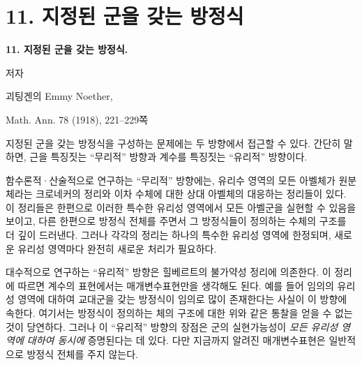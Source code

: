 
\section*{11. 지정된 군을 갖는 방정식}
\begin{center}
{\Large\bfseries 11. 지정된 군을 갖는 방정식.}\par
\vspace{0.75em}
저자\par
\vspace{0.75em}
괴팅겐의 Emmy Noether,\par
\vspace{1.5em}
Math. Ann. 78 (1918), 221--229쪽
\end{center}

\vspace{4em}

지정된 군을 갖는 방정식을 구성하는 문제에는 두 방향에서 접근할 수 있다. 간단히 말하면, 근을 특징짓는 ``무리적'' 방향과 계수를 특징짓는 ``유리적'' 방향이다.

함수론적·산술적으로 연구하는 ``무리적'' 방향에는, 유리수 영역의 모든 아벨체가 원분체라는 크로네커의 정리와 이차 수체에 대한 상대 아벨체의 대응하는 정리들이 있다. 이 정리들은 한편으로 이러한 특수한 유리성 영역에서 모든 아벨군을 실현할 수 있음을 보이고, 다른 한편으로 방정식 전체를 주면서 그 방정식들이 정의하는 수체의 구조를 더 깊이 드러낸다. 그러나 각각의 정리는 하나의 특수한 유리성 영역에 한정되며, 새로운 유리성 영역마다 완전히 새로운 처리가 필요하다.

대수적으로 연구하는 ``유리적'' 방향은 힐베르트의 불가약성 정리에 의존한다. 이 정리에 따르면 계수의 표현에서는 매개변수표현만을 생각해도 된다. 예를 들어 임의의 유리성 영역에 대하여 교대군을 갖는 방정식이 임의로 많이 존재한다는 사실이 이 방향에 속한다. 여기서는 방정식이 정의하는 체의 구조에 대한 위와 같은 통찰을 얻을 수 없는 것이 당연하다. 그러나 이 ``유리적'' 방향의 장점은 군의 실현가능성이 \emph{모든 유리성 영역에 대하여 동시에} 증명된다는 데 있다. 다만 지금까지 알려진 매개변수표현은 일반적으로 방정식 전체를 주지 않는다.

